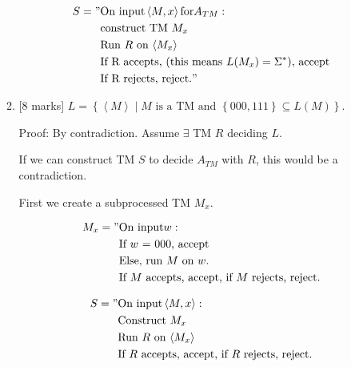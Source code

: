 \documentclass{article}
\newcommand{\set}[1]{{\left\{#1\right\}}}    %
\newcommand{\enc}[1]{\left<#1\right>}
\begin{document}
\begin{enumerate}
\begin{enumerate}
                    \begin{equation}
                        \begin{split}
                           S = "& \text{On input} \enc{M,x} \text{for} A_{TM}: \\
                                & \text{construct TM } M_x \\
                                & \text{Run $R$ on $\enc{M_x}$} \\
                                & \text{If R accepts, (this means $L(M_x) = \Sigma^*$), accept} \\
                                & \text{If R rejects, reject.}"
                        \end{split}
                    \end{equation}

            \item {[8 marks]} $L=\set{\enc{M}\mid M\text{ is a TM and }\set{000,111}\subseteq L(M)}$.


            		Proof: By contradiction. Assume $\exists$ TM $R$ deciding $L$.

                    If we can construct TM $S$ to decide $A_{TM}$ with $R$, this would be a contradiction.

                    First we create a subprocessed TM $M_x$.

                    \begin{equation}
                        \begin{split}
                           M_x = "& \text{On input} w: \\
                                & \text{If $w$ = $000$, accept} \\
                                & \text{Else, run $M$ on $w$.} \\
                                & \text{If $M$ accepts, accept, if $M$ rejects, reject.}
                        \end{split}
                    \end{equation}

                    \begin{equation}
                        \begin{split}
                           S = "& \text{On input} \enc{M,x}: \\
                                & \text{Construct $M_x$} \\
                                & \text{Run $R$ on $\enc{M_x}$} \\
                                & \text{If $R$ accepts, accept, if $R$ rejects, reject.}
                        \end{split}
                    \end{equation}



\end{enumerate}
\end{enumerate}
\end{document}
